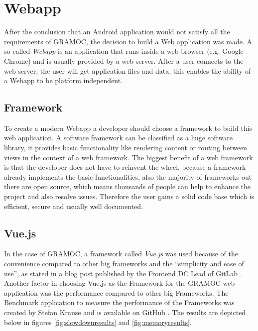 \chapter{Webapp}
\label{ch:Webapp}

\author{Nico Leidenfrost}
%
After the conclusion that an Android application would not satisfy all the requirements of GRAMOC, the decision to build a Web application was made. A so called \textit{Webapp} is an application that runs inside a web browser (e.g. Google Chrome) and is usually provided by a web server. After a user connects to the web server, the user will get application files and data, this enables the ability of a Webapp to be platform independent.

\section{Framework}
To create a modern Webapp a developer should choose a framework to build this web application. A software framework can be classified as a huge software library, it provides basic functionality like rendering content or routing between views in the context of a web framework. The biggest benefit of a web framework is that the developer does not have to reinvent the wheel, because a framework already implements the basic functionalities, also the majority of frameworks out there are open source, which means thousands of people can help to enhance the project and also resolve issues. Therefore the user gains a solid code base which is efficient, secure and usually well documented.

\section{Vue.js}
In the case of GRAMOC, a framework called \textit{Vue.js} was used because of the convenience compared to other big frameworks and the ``simplicity and ease of use'', as stated in a blog post published by the Frontend DC Lead of GitLab \autocite{Vue} \autocite{WhyVue} \autocite{GitLab}. Another factor in choosing Vue.js as the Framework for the GRAMOC web application was the performance compared to other big Frameworks. The Benchmark application to measure the performance of the Frameworks was created by Stefan Krause and is available on GitHub \autocite{FrameworkBenchmark}. The results are depicted below in figures \vref{fig:slowdownresults} and \vref{fig:memoryresults}.

\frameworkdata

